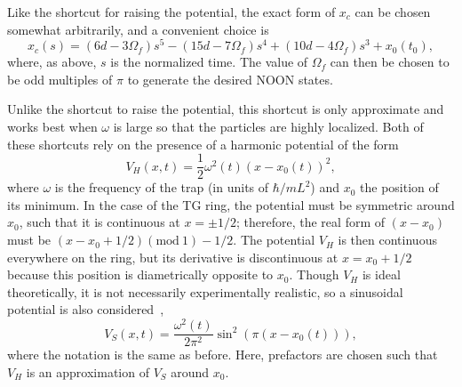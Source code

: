Like the shortcut for raising the potential, the exact form of $x_c$ can be chosen somewhat arbitrarily, and a convenient choice is
\begin{equation}
 x_c(s)= (6 d -3 \Omega_f )s^5 - (15 d-7 \Omega_f )s^4+(10d-4 \Omega_f) s^3 + x_0(t_0),
\end{equation}
where, as above, $s$ is the normalized time.
The value of $\Omega_f$ can then be chosen to be odd multiples of $\pi$ to generate the desired NOON states.

Unlike the shortcut to raise the potential, this shortcut is only approximate and works best when $\omega$ is large so that the particles are highly localized.
Both of these shortcuts rely on the presence of a harmonic potential of the form
\begin{equation}
 V_{H}(x,t)=\frac 1 2 \omega^2(t) \left( x-x_0(t)\right)^2, 
\end{equation}
where  $\omega$ is the frequency of the trap (in units of $\hbar/mL^2$) and $x_0$ the position of its minimum.
In the case of the TG ring, the potential must be symmetric around $x_0$, such that it is continuous at $x=\pm 1/2$; therefore, the real form of $(x-x_0)$ must be $(x-x_0+1/2)(\mathrm{mod~} 1)-1/2$.
The potential $V_H$ is then continuous everywhere on the ring, but its derivative is discontinuous at $x=x_0+1/2$ because this position is diametrically opposite to $x_0$.
Though $V_H$ is ideal theoretically, it is not necessarily experimentally realistic, so a sinusoidal potential is also considered~\cite{phelan2013,masuda2014},
\begin{equation}
 V_{S}(x,t)= \frac{\omega^2(t)}{2 \pi^2} \sin^2 \left(\pi \left( x-x_0(t)\right) \right) ,
\end{equation}
where the notation is the same as before. 
Here, prefactors are chosen such that $V_{H}$ is an approximation of $V_S$ around $x_0$.

